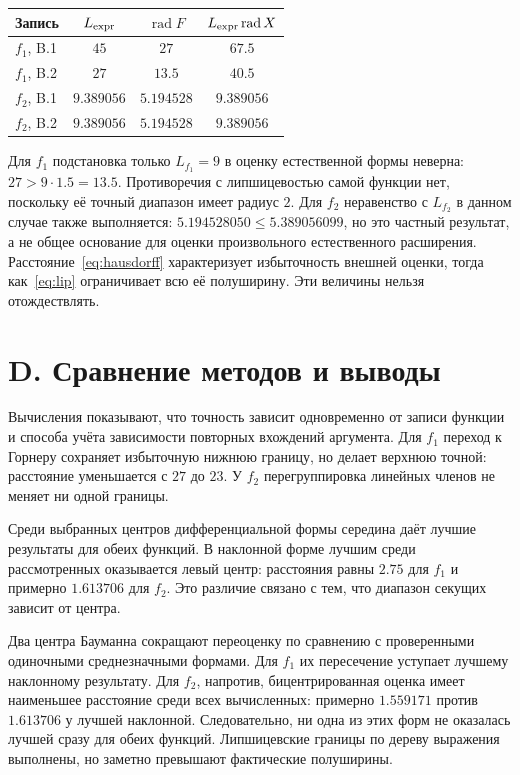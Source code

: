 \documentclass[12pt,a4paper]{article}
\newcommand{\rad}{\operatorname{rad}}
\begin{document}
\begin{center}
{\small
\begin{tabular}{lccc}
\toprule
Запись & $L_{\rm expr}$ & $\rad F$ & $L_{\rm expr}\rad X$\\\midrule
$f_1$, B.1 & $45$ & $27$ & $67.5$\\
$f_1$, B.2 & $27$ & $13.5$ & $40.5$\\
$f_2$, B.1 & $9.389056$ & $5.194528$ & $9.389056$\\
$f_2$, B.2 & $9.389056$ & $5.194528$ & $9.389056$\\
\bottomrule
\end{tabular}}
\end{center}

Для $f_1$ подстановка только $L_{f_1}=9$ в оценку естественной
формы неверна: $27>9\cdot1.5=13.5$.
Противоречия с липшицевостью самой функции нет, поскольку её точный
диапазон имеет радиус $2$. Для $f_2$ неравенство с $L_{f_2}$
в данном случае также выполняется: $5.194528050\leq5.389056099$,
но это частный результат, а не общее основание для оценки
произвольного естественного расширения.
Расстояние~\eqref{eq:hausdorff} характеризует избыточность внешней
оценки, тогда как~\eqref{eq:lip} ограничивает всю её полуширину.
Эти величины нельзя отождествлять.

\section*{D. Сравнение методов и выводы}
Вычисления показывают, что точность зависит одновременно от записи
функции и способа учёта зависимости повторных вхождений аргумента.
Для $f_1$ переход к Горнеру сохраняет избыточную нижнюю границу,
но делает верхнюю точной: расстояние уменьшается с $27$ до $23$.
У $f_2$ перегруппировка линейных членов не меняет ни одной границы.

Среди выбранных центров дифференциальной формы середина даёт лучшие
результаты для обеих функций. В наклонной форме лучшим среди
рассмотренных оказывается левый центр: расстояния равны $2.75$
для $f_1$ и примерно $1.613706$ для $f_2$.
Это различие связано с тем, что диапазон секущих зависит от центра.

Два центра Бауманна сокращают переоценку по сравнению с проверенными
одиночными среднезначными формами. Для $f_1$ их пересечение уступает
лучшему наклонному результату. Для $f_2$, напротив, бицентрированная
оценка имеет наименьшее расстояние среди всех вычисленных:
примерно $1.559171$ против $1.613706$ у лучшей наклонной.
Следовательно, ни одна из этих форм не оказалась лучшей сразу для
обеих функций. Липшицевские границы по дереву выражения выполнены,
но заметно превышают фактические полуширины.
\end{document}
